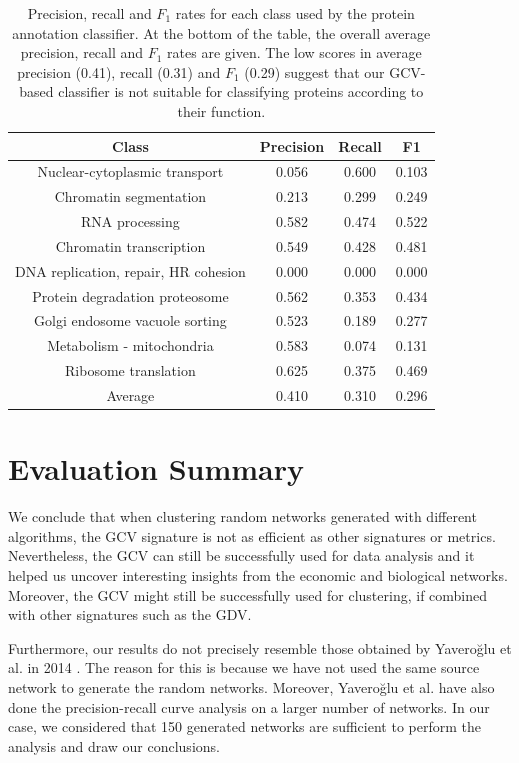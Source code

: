 \begin{table}[H]
  \centering
  \begin{tabular}{  c | c  c  c }
    Class & Precision & Recall & F1\\
    \hline
    Nuclear-cytoplasmic transport & 0.056 & 0.600 & 0.103\\
    Chromatin segmentation  & 0.213 & 0.299 & 0.249\\
    RNA processing & 0.582 & 0.474 & 0.522\\
    Chromatin transcription & 0.549 & 0.428 & 0.481\\
    DNA replication, repair, HR cohesion & 0.000 & 0.000 & 0.000\\
    Protein degradation proteosome & 0.562 & 0.353 & 0.434\\
    Golgi endosome vacuole sorting & 0.523 & 0.189 & 0.277\\
    Metabolism - mitochondria & 0.583 & 0.074 & 0.131\\
    Ribosome translation & 0.625 & 0.375 & 0.469\\
    \hline
    Average & 0.410 & 0.310 & 0.296\\
  \end{tabular}
  \caption[Precision, recall and $F_1$ rates for each class used by the protein annotation classifier.]{Precision, recall and $F_1$ rates for each class used by the protein annotation classifier. At the bottom of the table, the overall average precision, recall and $F_1$ rates are given. The low scores in average precision (0.41), recall (0.31) and $F_1$ (0.29) suggest that our GCV-based classifier is not suitable for classifying proteins according to their function.}
  \label{tab:prec_rec_f1_table}
\end{table}

\section{Evaluation Summary}

We conclude that when clustering random networks generated with different algorithms, the GCV signature is not as efficient as other signatures or metrics. Nevertheless, the GCV can still be successfully used for data analysis and it helped us uncover interesting insights from the economic and biological networks. Moreover, the GCV might still be successfully used for clustering, if combined with other signatures such as the GDV.

Furthermore, our results do not precisely resemble those obtained by Yavero\u{g}lu et al. in 2014 \cite{yaverouglu2014revealing}. The reason for this is because we have not used the same source network to generate the random networks. Moreover, Yavero\u{g}lu et al. have also done the precision-recall curve analysis on a larger number of networks. In our case, we considered that 150 generated networks are sufficient to perform the analysis and draw our conclusions.

